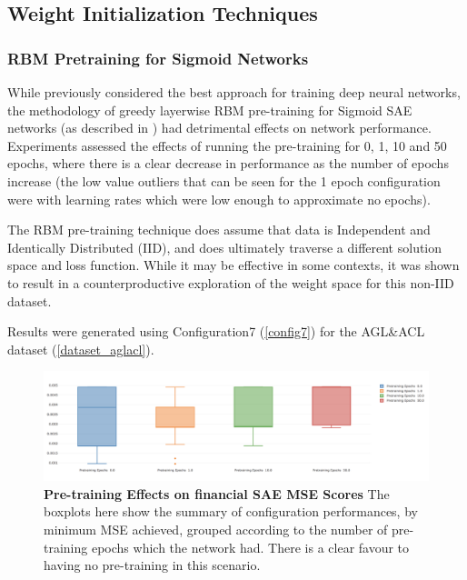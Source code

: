 \documentclass[a4paper,latin]{paper}
\begin{document}
\subsection{Weight Initialization Techniques}

\subsubsection{RBM Pretraining for Sigmoid Networks}

While previously considered the best approach for training deep neural networks, the methodology of greedy layerwise RBM pre-training for Sigmoid SAE networks (as described in \cite{Hinton2}) had detrimental effects on network performance. Experiments assessed the effects of running the pre-training for 0, 1, 10 and 50 epochs, where there is a clear decrease in performance as the number of epochs increase (the low value outliers that can be seen for the 1 epoch configuration were with learning rates which were low enough to approximate no epochs). \newline

The RBM pre-training technique does assume that data is Independent and Identically Distributed (IID), and does ultimately traverse a different solution space and loss function. While it may be effective in some contexts, it was shown to result in a counterproductive exploration of the weight space for this non-IID dataset. \newline

Results were generated using Configuration7 (\ref{config7}) for the AGL\&ACL dataset (\ref{dataset_aglacl}).


\begin{figure}[H]
	\centering \includegraphics[scale=0.3]{images/iteration_two/pt/SAE_Pre-training_epochs_Min_Test_MSE.png}
	\caption{\textbf{Pre-training Effects on financial SAE MSE Scores} \newline The boxplots here show the summary of configuration performances, by minimum MSE achieved, grouped according to the number of pre-training epochs which the network had. There is a clear favour to having no pre-training in this scenario.}
	\label{figure-results-pretraining-effect}
\end{figure}		
\end{document}
